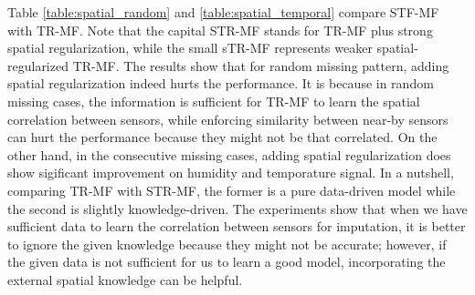 Table \ref{table:spatial_random} and \ref{table:spatial_temporal} compare STF-MF with TR-MF.
Note that the capital STR-MF stands for TR-MF plus strong spatial regularization, while the small sTR-MF represents weaker spatial-regularized TR-MF. The results show that for random missing pattern, adding spatial regularization indeed hurts the performance. It is because in random missing cases, the information is sufficient for TR-MF to learn the spatial correlation between sensors, while enforcing similarity between near-by sensors can hurt the performance because they might not be that correlated. On the other hand, in the consecutive missing cases, adding spatial regularization does show sigificant improvement on humidity and temporature signal. In a nutshell, comparing TR-MF with STR-MF, the former is a pure data-driven model while the second is slightly knowledge-driven. The experiments show that when we have sufficient data to learn the correlation between sensors for imputation, it is better to ignore the given knowledge because they might not be accurate; however, if the given data is not sufficient for us to learn a good model, incorporating the external spatial knowledge can be helpful.

